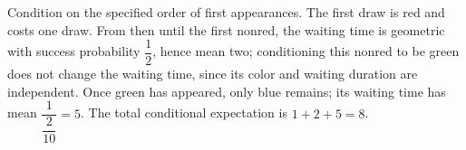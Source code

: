 Condition on the specified order of first appearances. The first draw is red and costs one draw. From then until the first nonred, the waiting time is geometric with success probability $\dfrac{1}{2}$, hence mean two; conditioning this nonred to be green does not change the waiting time, since its color and waiting duration are independent. Once green has appeared, only blue remains; its waiting time has mean $\dfrac{1}{\dfrac{2}{10}}=5$. The total conditional expectation is $1+2+5=\boxed8$.

